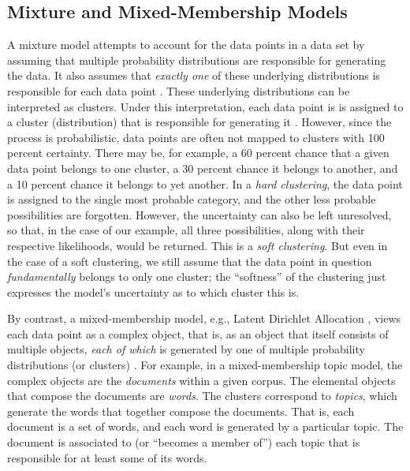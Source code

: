 \subsection{Mixture and Mixed-Membership Models}
\label{sec:mixture-models}
A mixture model attempts to account for the data points in a data set 
by assuming that multiple probability
distributions are responsible for generating the data. 
It also assumes that \emph{exactly one}
of these underlying distributions is responsible for each data point \citep{bishop:2006}. 
 These underlying 
distributions can be interpreted as clusters. Under this interpretation, each data point is 
is assigned to a cluster (distribution) that is responsible for 
generating it \citep{fraley:1998}. 
However, since the process is probabilistic,
data points are often not mapped to clusters with 100 percent certainty. 
There may be, for example, a 60 percent chance that a given data point belongs to one 
cluster, a 30 percent chance it belongs to another, and a 10 percent chance 
it belongs to yet another. In a \emph{hard clustering}, the data point is 
assigned to the single most probable category, and the other less probable 
possibilities are forgotten. However, the uncertainty can also be left 
unresolved, so that, in the case of our example, all three possibilities, 
along with their respective likelihoods, would be returned. This is a 
\emph{soft clustering}. But even in the case of a soft clustering, 
we still assume that the data point in question \emph{fundamentally} 
belongs to only one cluster; 
the ``softness'' of the clustering just expresses the model's uncertainty 
as to which cluster this is. %

By contrast, a mixed-membership model, e.g., Latent Dirichlet Allocation \citep{blei-et-al:2003},
views each data point as a complex object, that is, as an object that itself consists of multiple objects, 
\emph{each of which} is generated by one of multiple probability distributions (or clusters) \citep{airoldi-et-al:2014}. 
For example, in a mixed-membership topic model, the complex objects are the 
\emph{documents} within a given corpus. The elemental objects that compose 
the documents are \emph{words}. The clusters correspond to \emph{topics}, which generate 
the words that together compose the documents. That is, each document is a set of words, and each 
word is generated by a particular topic. The document is associated to 
(or ``becomes a member of'') each topic that is
responsible for at least some of its words. 

